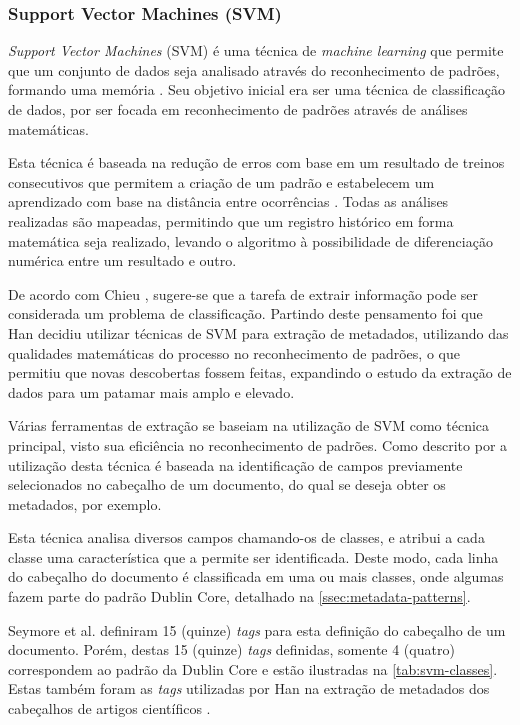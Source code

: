 \subsubsection{Support Vector Machines (SVM)}
\label{sssec:svm}

\emph{Support Vector Machines} (SVM) é uma técnica de \textit{machine learning} que permite que um conjunto de dados seja analisado através do reconhecimento de padrões, formando uma memória \cite{Vapnik-SVM}. Seu objetivo inicial era ser uma técnica de classificação de dados, por ser focada em reconhecimento de padrões através de análises matemáticas.

Esta técnica é baseada na redução de erros com base em um resultado de treinos consecutivos que permitem a criação de um padrão e estabelecem um aprendizado com base na distância entre ocorrências \cite{Vapnik-SVM}. Todas as análises realizadas são mapeadas, permitindo que um registro histórico em forma matemática seja realizado, levando o algoritmo à possibilidade de diferenciação numérica entre um resultado e outro.

De acordo com Chieu \cite{Chieu}, sugere-se que a tarefa de extrair informação pode ser considerada um problema de classificação. Partindo deste pensamento foi que Han \cite{Han-SVM} decidiu utilizar técnicas de SVM para extração de metadados, utilizando das qualidades matemáticas do processo no reconhecimento de padrões, o que permitiu que novas descobertas fossem feitas, expandindo o estudo da extração de dados para um patamar mais amplo e elevado.

Várias ferramentas de extração se baseiam na utilização de SVM como técnica principal, visto sua eficiência no reconhecimento de padrões. Como descrito por \cite{Han-SVM} a utilização desta técnica é baseada na identificação de campos previamente selecionados no cabeçalho de um documento, do qual se deseja obter os metadados, por exemplo.

Esta técnica analisa diversos campos chamando-os de classes, e atribui a cada classe uma característica que a permite ser identificada. Deste modo, cada linha do cabeçalho do documento é classificada em uma ou mais classes, onde algumas fazem parte do padrão Dublin Core, detalhado na \autoref{ssec:metadata-patterns}.

Seymore et al. \cite{Seymore-HMM-IE} definiram 15 (quinze) \textit{tags} para esta definição do cabeçalho de um documento. Porém, destas 15 (quinze) \textit{tags} definidas, somente 4 (quatro) correspondem ao padrão da Dublin Core e estão ilustradas na \autoref{tab:svm-classes}. Estas também foram as \textit{tags} utilizadas por Han na extração de metadados dos cabeçalhos de artigos científicos \cite{Han-SVM}.


